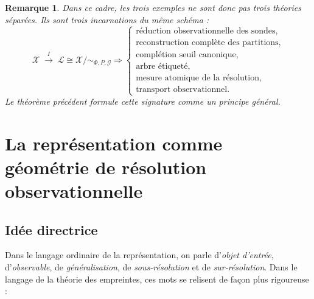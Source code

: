 \documentclass[11pt,a4paper]{article}
\newtheorem{remark}{Remarque}
\begin{document}
\begin{appendices}
\begin{remark}
Dans ce cadre, les trois exemples ne sont donc pas trois théories séparées. Ils sont trois incarnations du même schéma :
\[
\mathcal X
\;\xrightarrow{\,I\,}\;
\mathcal L
\cong
\mathcal X/{\sim_{\Phi,P,\mathcal G}}
\Longrightarrow
\begin{cases}
\text{réduction observationnelle des sondes},\\
\text{reconstruction complète des partitions},\\
\text{complétion seuil canonique},\\
\text{arbre étiqueté},\\
\text{mesure atomique de la résolution},\\
\text{transport observationnel}.
\end{cases}
\]
Le théorème précédent formule cette signature comme un principe général.
\end{remark}











\section{La représentation comme géométrie de résolution observationnelle}

\subsection{Idée directrice}

Dans le langage ordinaire de la représentation, on parle d'\emph{objet d'entrée}, d'\emph{observable}, de \emph{généralisation}, de \emph{sous-résolution} et de \emph{sur-résolution}.  
Dans le langage de la théorie des empreintes, ces mots se relisent de façon plus rigoureuse :


\end{appendices}
\end{document}
